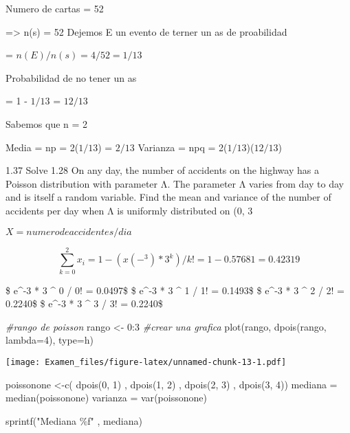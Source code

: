 \documentclass[
]{article}
\newenvironment{Shaded}{\begin{snugshade}}{\end{snugshade}}
\newcommand{\AttributeTok}[1]{\textcolor[rgb]{0.77,0.63,0.00}{#1}}
\newcommand{\CommentTok}[1]{\textcolor[rgb]{0.56,0.35,0.01}{\textit{#1}}}
\newcommand{\DecValTok}[1]{\textcolor[rgb]{0.00,0.00,0.81}{#1}}
\newcommand{\FunctionTok}[1]{\textcolor[rgb]{0.00,0.00,0.00}{#1}}
\newcommand{\NormalTok}[1]{#1}
\newcommand{\OtherTok}[1]{\textcolor[rgb]{0.56,0.35,0.01}{#1}}
\newcommand{\SpecialCharTok}[1]{\textcolor[rgb]{0.00,0.00,0.00}{#1}}
\newcommand{\StringTok}[1]{\textcolor[rgb]{0.31,0.60,0.02}{#1}}
\begin{document}
Numero de cartas = 52

=\textgreater{} n(s) = 52 Dejemos E un evento de terner un as de
proabilidad

= \(n(E)/n(s) = 4/52 = 1/13\)

Probabilidad de no tener un as

= 1 - \(1/13\) = \(12/13\)

Sabemos que n = 2

Media = np = 2(\(1/13\)) = \(2/13\) Varianza = npq =
2(\(1/13\))(\(12/13\))

1.37 Solve 1.28 On any day, the number of accidents on the highway has a
Poisson distribution with parameter Λ. The parameter Λ varies from day
to day and is itself a random variable. Find the mean and variance of
the number of accidents per day when Λ is uniformly distributed on (0, 3

\(X = numero de accidentes / dia\)

\[
\sum_{k=0}^{2}x_{i} = 1 - (x(-^3)*3^k)/k! = 1 - 0.57681 = 0.42319
\]

\$ e\^{}-3 * 3 \^{} 0 / 0! = 0.0497\$ \$ e\^{}-3 * 3 \^{} 1 / 1! =
0.1493\$ \$ e\^{}-3 * 3 \^{} 2 / 2! = 0.2240\$ \$ e\^{}-3 * 3 \^{} 3 /
3! = 0.2240\$

\begin{Shaded}
\begin{Highlighting}[]
\CommentTok{\#rango de poisson }
\NormalTok{rango }\OtherTok{\textless{}{-}} \DecValTok{0}\SpecialCharTok{:}\DecValTok{3}
\CommentTok{\#crear una grafica}
\FunctionTok{plot}\NormalTok{(rango, }\FunctionTok{dpois}\NormalTok{(rango, }\AttributeTok{lambda=}\DecValTok{4}\NormalTok{), }\AttributeTok{type=}\StringTok{\textquotesingle{}h\textquotesingle{}}\NormalTok{)}
\end{Highlighting}
\end{Shaded}

\texttt{[image: Examen\_files/figure-latex/unnamed-chunk-13-1.pdf]}

\begin{Shaded}
\begin{Highlighting}[]
\NormalTok{poissonone }\OtherTok{\textless{}{-}}\FunctionTok{c}\NormalTok{( }\FunctionTok{dpois}\NormalTok{(}\DecValTok{0}\NormalTok{, }\DecValTok{1}\NormalTok{) , }\FunctionTok{dpois}\NormalTok{(}\DecValTok{1}\NormalTok{, }\DecValTok{2}\NormalTok{) , }\FunctionTok{dpois}\NormalTok{(}\DecValTok{2}\NormalTok{, }\DecValTok{3}\NormalTok{) ,  }\FunctionTok{dpois}\NormalTok{(}\DecValTok{3}\NormalTok{, }\DecValTok{4}\NormalTok{))}
\NormalTok{mediana }\OtherTok{=} \FunctionTok{median}\NormalTok{(poissonone)}
\NormalTok{varianza }\OtherTok{=} \FunctionTok{var}\NormalTok{(poissonone)}

\FunctionTok{sprintf}\NormalTok{(}\StringTok{"Mediana \%f"}\NormalTok{ , mediana)}
\end{Highlighting}
\end{Shaded}
\end{document}

